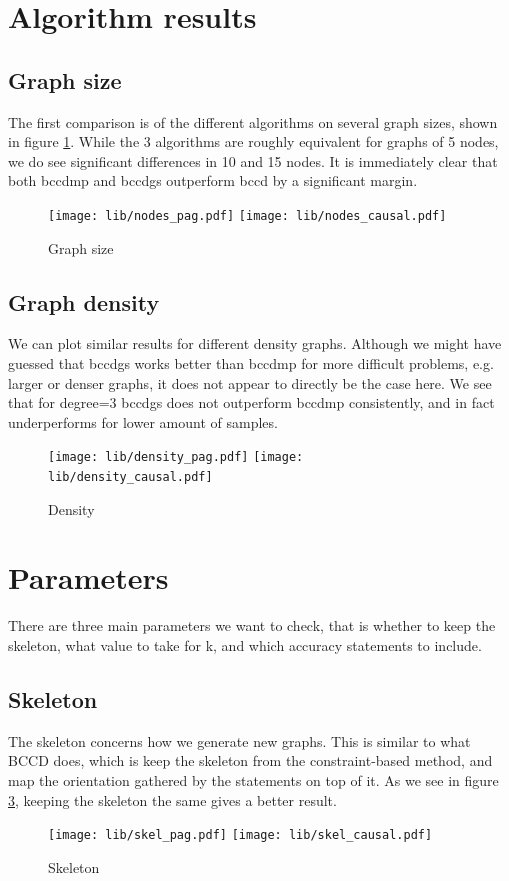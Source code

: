 \documentclass[11pt,a4paper]{report}
\theoremstyle{definition}
\begin{document}
\section{Algorithm results}

\subsection{Graph size}
The first comparison is of the different algorithms on several graph
sizes, shown in figure \ref{fig:nodes_causal}. While the 3 algorithms are
roughly equivalent for graphs of 5 nodes, we do see significant
differences in 10 and 15 nodes. It is immediately clear that both bccdmp
and bccdgs outperform bccd by a significant margin.
\begin{figure}
  \centering
  \texttt{[image: lib/nodes\_pag.pdf]}
  \texttt{[image: lib/nodes\_causal.pdf]}
  \caption{Graph size}
  \label{fig:nodes_causal}
\end{figure}

\subsection{Graph density}
We can plot similar results for different density graphs. Although we
might have guessed that bccdgs works better than bccdmp for more difficult
problems, e.g. larger or denser graphs, it does not appear to directly be
the case here. We see that for degree=3 bccdgs does not outperform bccdmp
consistently, and in fact underperforms for lower amount of samples.
\begin{figure}
  \centering
  \texttt{[image: lib/density\_pag.pdf]}
  \texttt{[image: lib/density\_causal.pdf]}
  \caption{Density}
  \label{fig:density_causal}
\end{figure}

\section{Parameters}
There are three main parameters we want to check, that is whether to keep
the skeleton, what value to take for k, and which accuracy statements to
include.

\subsection{Skeleton}
The skeleton concerns how we generate new graphs. This is similar to what
BCCD does, which is keep the skeleton from the constraint-based method,
and map the orientation gathered by the statements on top of it. As we see
in figure \ref{fig:skel_causal}, keeping the skeleton the same gives a
better result.
\begin{figure}
  \centering
  \texttt{[image: lib/skel\_pag.pdf]}
  \texttt{[image: lib/skel\_causal.pdf]}
  \caption{Skeleton}
  \label{fig:skel_causal}
\end{figure}
\end{document}
